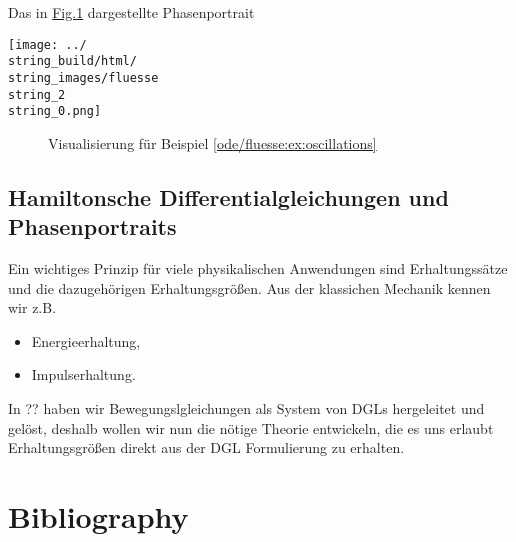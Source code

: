 \documentclass[letterpaper,10pt,english]{jupyterBook}
\begin{document}
\par
Das in \hyperref[\detokenize{ode/fluesse:fig-harmonic-oscillator}]{Fig.\@ \ref{\detokenize{ode/fluesse:fig-harmonic-oscillator}}} dargestellte Phasenportrait

\noindent\texttt{[image: ../\\string\_build/html/\\string\_images/fluesse\\string\_2\\string\_0.png]}

\begin{figure}[htbp]
\centering

\caption{Visualisierung für Beispiel \cref{ode/fluesse:ex:oscillations} }\label{\detokenize{ode/fluesse:fig-harmonic-oscillator}}\end{figure}


\section{Hamiltonsche Differentialgleichungen und Phasenportraits}
\label{\detokenize{ode/hamilton:hamiltonsche-differentialgleichungen-und-phasenportraits}}\label{\detokenize{ode/hamilton::doc}}
\par
Ein wichtiges Prinzip für viele physikalischen Anwendungen sind Erhaltungssätze und die dazugehörigen Erhaltungsgrößen. Aus der klassichen Mechanik kennen wir z.B.
\begin{itemize}
\item {} 
\par
Energieerhaltung,

\item {} 
\par
Impulserhaltung.

\end{itemize}

\par
In ?? haben wir Bewegungslgleichungen als System von DGLs hergeleitet und gelöst, deshalb wollen wir nun die nötige Theorie entwickeln, die es uns erlaubt Erhaltungsgrößen direkt aus der DGL Formulierung zu erhalten.
\label{ode/hamilton:example-0}
\begin{example}{}{}


\end{example}


\chapter{Bibliography}
\label{\detokenize{references:bibliography}}\label{\detokenize{references::doc}}
\par
\end{document}
